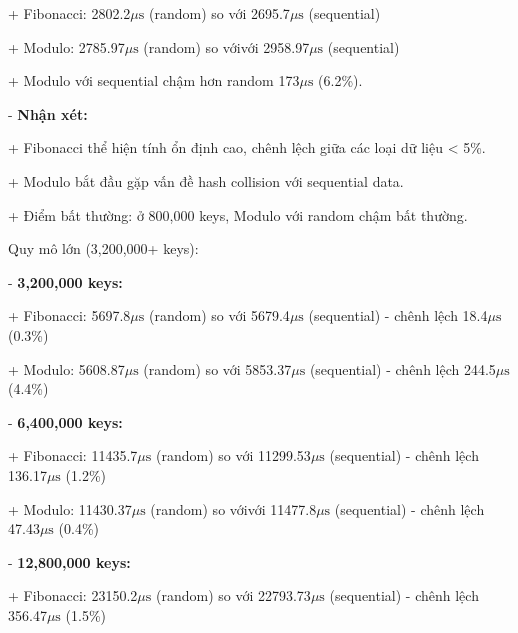 \documentclass[12pt,a4paper]{report}
\begin{document}
        \hspace{1cm}+ Fibonacci: 2802.2$\mu\text{s}$ (random) so với 2695.7$\mu\text{s}$ (sequential)
        
        \hspace{1cm}+ Modulo: 2785.97$\mu\text{s}$ (random) so vớivới 2958.97$\mu\text{s}$ (sequential)
        
        \hspace{1cm}+ Modulo với sequential chậm hơn random 173$\mu\text{s}$ (6.2\%).



- \textbf{Nhận xét:}

    \hspace{1cm}+ Fibonacci thể hiện tính ổn định cao, chênh lệch giữa các loại dữ liệu < 5\%.
    
    \hspace{1cm}+ Modulo bắt đầu gặp vấn đề hash collision với sequential data.
    
    \hspace{1cm}+ Điểm bất thường: ở 800,000 keys, Modulo với random chậm bất thường.

Quy mô lớn (3,200,000+ keys):

    - \textbf{3,200,000 keys:}

        \hspace{1cm}+ Fibonacci: 5697.8$\mu\text{s}$ (random) so với 5679.4$\mu\text{s}$ (sequential) - chênh lệch 18.4$\mu\text{s}$ (0.3\%)
        
        \hspace{1cm}+ Modulo: 5608.87$\mu\text{s}$ (random) so với 5853.37$\mu\text{s}$ (sequential) - chênh lệch 244.5$\mu\text{s}$ (4.4\%)

    - \textbf{6,400,000 keys:}

        \hspace{1cm}+ Fibonacci: 11435.7$\mu\text{s}$ (random) so với 11299.53$\mu\text{s}$ (sequential) - chênh lệch 136.17$\mu\text{s}$ (1.2\%)
        
        \hspace{1cm}+ Modulo: 11430.37$\mu\text{s}$ (random) so vớivới 11477.8$\mu\text{s}$ (sequential) - chênh lệch 47.43$\mu\text{s}$ (0.4\%)
        
    - \textbf{12,800,000 keys:}

        \hspace{1cm}+ Fibonacci: 23150.2$\mu\text{s}$ (random) so với 22793.73$\mu\text{s}$ (sequential) - chênh lệch 356.47$\mu\text{s}$ (1.5\%)
        
\end{document}

